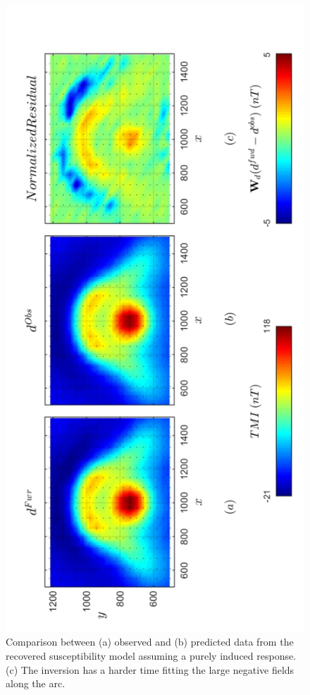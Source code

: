 \begin{figure}[h!]
\centering
\includegraphics[scale=0.52, angle =270]{3D_Inv_l2l2_pred_REMANENT.pdf}
\caption{Comparison between (a) observed and (b) predicted data from the recovered susceptibility model assuming a purely induced response. (c) The inversion has a harder time fitting the large negative fields along the arc.}
\label{fig:3D_Inv_l2l2_pred_REMANENT}
\end{figure}

